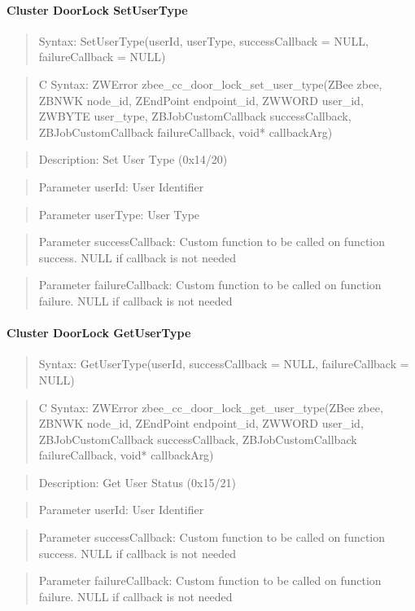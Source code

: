 \paragraph{Cluster DoorLock SetUserType}
\begin{quote}Syntax: SetUserType(userId, userType, successCallback = NULL, failureCallback = NULL)\end{quote}
\begin{quote}C Syntax: ZWError zbee\_cc\_door\_lock\_set\_user\_type(ZBee zbee, ZBNWK node\_id, ZEndPoint endpoint\_id, ZWWORD user\_id, ZWBYTE user\_type, ZBJobCustomCallback successCallback, ZBJobCustomCallback failureCallback, void* callbackArg)\end{quote}
\begin{quote}Description: Set User Type (0x14/20)\end{quote}
\begin{quote}Parameter userId: User Identifier\end{quote}
\begin{quote}Parameter userType: User Type\end{quote}
\begin{quote}Parameter successCallback: Custom function to be called on function success. NULL if callback is not needed\end{quote}
\begin{quote}Parameter failureCallback: Custom function to be called on function failure. NULL if callback is not needed\end{quote}


\paragraph{Cluster DoorLock GetUserType}
\begin{quote}Syntax: GetUserType(userId, successCallback = NULL, failureCallback = NULL)\end{quote}
\begin{quote}C Syntax: ZWError zbee\_cc\_door\_lock\_get\_user\_type(ZBee zbee, ZBNWK node\_id, ZEndPoint endpoint\_id, ZWWORD user\_id, ZBJobCustomCallback successCallback, ZBJobCustomCallback failureCallback, void* callbackArg)\end{quote}
\begin{quote}Description: Get User Status (0x15/21)\end{quote}
\begin{quote}Parameter userId: User Identifier\end{quote}
\begin{quote}Parameter successCallback: Custom function to be called on function success. NULL if callback is not needed\end{quote}
\begin{quote}Parameter failureCallback: Custom function to be called on function failure. NULL if callback is not needed\end{quote}


